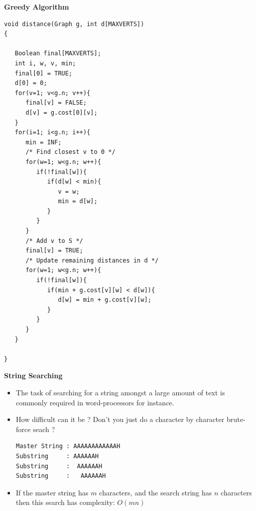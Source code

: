 \documentclass[a4,portraitt]{slides}
\begin{document}
\newpage
{\samepage
\begin{center}
{\Large{\bf Greedy Algorithm}}
\end{center}
{\small
\begin{verbatim}
void distance(Graph g, int d[MAXVERTS])
{

   Boolean final[MAXVERTS];
   int i, w, v, min;
   final[0] = TRUE;
   d[0] = 0;
   for(v=1; v<g.n; v++){
      final[v] = FALSE;
      d[v] = g.cost[0][v];
   }
   for(i=1; i<g.n; i++){
      min = INF;
      /* Find closest v to 0 */
      for(w=1; w<g.n; w++){
         if(!final[w]){
            if(d[w] < min){
               v = w;
               min = d[w];
            }
         }
      }
      /* Add v to S */
      final[v] = TRUE;
      /* Update remaining distances in d */
      for(w=1; w<g.n; w++){
         if(!final[w]){
            if(min + g.cost[v][w] < d[w]){
               d[w] = min + g.cost[v][w];
            }
         }
      }
   }

}
\end{verbatim}
}}


\newpage
{\samepage
\begin{center}
{\Large{\bf String Searching}}
\end{center}
\begin{itemize}
\item The task of searching for a string amongst a large
amount of text is commonly required in word-processors
for instance.
\item How difficult can it be ? Don't you just do a character by
character brute-force seach ?
\begin{verbatim}
Master String : AAAAAAAAAAAAH
Substring     : AAAAAAH
Substring     :  AAAAAAH
Substring     :   AAAAAAH
\end{verbatim}
\item If the master string has $m$ characters, and the search string
has $n$ characters then this search has complexity:
$O(mn)$
\end{itemize}
}
\end{document}

